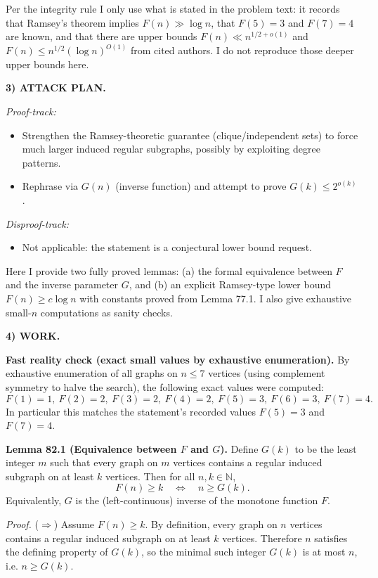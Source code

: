 Per the integrity rule I only use what is stated in the problem text: it records that Ramsey's theorem implies $F(n)\gg \log n$, that $F(5)=3$ and $F(7)=4$ are known, and that there are upper bounds $F(n)\ll n^{1/2+o(1)}$ and $F(n)\le n^{1/2}(\log n)^{O(1)}$ from cited authors. I do not reproduce those deeper upper bounds here.

\medskip
\noindent\textbf{3) ATTACK PLAN.}

\emph{Proof-track:}
\begin{itemize}
\item Strengthen the Ramsey-theoretic guarantee (clique/independent sets) to force much larger induced regular subgraphs, possibly by exploiting degree patterns.
\item Rephrase via $G(n)$ (inverse function) and attempt to prove $G(k)\le 2^{o(k)}$.
\end{itemize}
\emph{Disproof-track:}
\begin{itemize}
\item Not applicable: the statement is a conjectural lower bound request.
\end{itemize}

Here I provide two fully proved lemmas: (a) the formal equivalence between $F$ and the inverse parameter $G$, and (b) an explicit Ramsey-type lower bound $F(n)\ge c\log n$ with constants proved from Lemma 77.1. I also give exhaustive small-$n$ computations as sanity checks.

\medskip
\noindent\textbf{4) WORK.}

\noindent\textbf{Fast reality check (exact small values by exhaustive enumeration).}
By exhaustive enumeration of all graphs on $n\le 7$ vertices (using complement symmetry to halve the search), the following exact values were computed:
\[
F(1)=1,\ F(2)=2,\ F(3)=2,\ F(4)=2,\ F(5)=3,\ F(6)=3,\ F(7)=4.
\]
In particular this matches the statement's recorded values $F(5)=3$ and $F(7)=4$.

\medskip
\noindent\textbf{Lemma 82.1 (Equivalence between $F$ and $G$).}
Define $G(k)$ to be the least integer $m$ such that every graph on $m$ vertices contains a regular induced subgraph on at least $k$ vertices.
Then for all $n,k\in\mathbb{N}$,
\[
F(n)\ge k \quad\Longleftrightarrow\quad n\ge G(k).
\]
Equivalently, $G$ is the (left-continuous) inverse of the monotone function $F$.

\emph{Proof.}
($\Rightarrow$) Assume $F(n)\ge k$. By definition, every graph on $n$ vertices contains a regular induced subgraph on at least $k$ vertices. Therefore $n$ satisfies the defining property of $G(k)$, so the minimal such integer $G(k)$ is at most $n$, i.e. $n\ge G(k)$.

